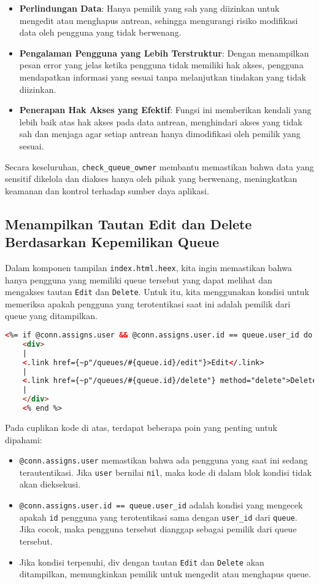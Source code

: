 \begin{itemize}
	\item \textbf{Perlindungan Data}: Hanya pemilik yang sah yang diizinkan untuk mengedit atau menghapus antrean, sehingga mengurangi risiko modifikasi data oleh pengguna yang tidak berwenang.
	\item \textbf{Pengalaman Pengguna yang Lebih Terstruktur}: Dengan menampilkan pesan error yang jelas ketika pengguna tidak memiliki hak akses, pengguna mendapatkan informasi yang sesuai tanpa melanjutkan tindakan yang tidak diizinkan.
	\item \textbf{Penerapan Hak Akses yang Efektif}: Fungsi ini memberikan kendali yang lebih baik atas hak akses pada data antrean, menghindari akses yang tidak sah dan menjaga agar setiap antrean hanya dimodifikasi oleh pemilik yang sesuai.
\end{itemize}

Secara keseluruhan, \texttt{check\_queue\_owner} membantu memastikan bahwa data yang sensitif dikelola dan diakses hanya oleh pihak yang berwenang, meningkatkan keamanan dan kontrol terhadap sumber daya aplikasi.


\subsection{Menampilkan Tautan Edit dan Delete Berdasarkan Kepemilikan Queue}
Dalam komponen tampilan \texttt{index.html.heex}, kita ingin memastikan bahwa hanya pengguna yang memiliki queue tersebut yang dapat melihat dan mengakses tautan \texttt{Edit} dan \texttt{Delete}. Untuk itu, kita menggunakan kondisi untuk memeriksa apakah pengguna yang terotentikasi saat ini adalah pemilik dari queue yang ditampilkan.

\begin{lstlisting}[language=HTML, caption={\texttt{lib/hello\_web/controllers/queue\_html/index.html.heex}}]
	<%= if @conn.assigns.user && @conn.assigns.user.id == queue.user_id do %>
	<div>
	|
	<.link href={~p"/queues/#{queue.id}/edit"}>Edit</.link>
	|
	<.link href={~p"/queues/#{queue.id}/delete"} method="delete">Delete</.link>
	|
	</div>
	<% end %>
\end{lstlisting}

Pada cuplikan kode di atas, terdapat beberapa poin yang penting untuk dipahami:

\begin{itemize}
	\item \texttt{@conn.assigns.user} memastikan bahwa ada pengguna yang saat ini sedang terautentikasi. Jika \texttt{user} bernilai \texttt{nil}, maka kode di dalam blok kondisi tidak akan dieksekusi.
	\item \texttt{@conn.assigns.user.id == queue.user\_id} adalah kondisi yang mengecek apakah \texttt{id} pengguna yang terotentikasi sama dengan \texttt{user\_id} dari \texttt{queue}. Jika cocok, maka pengguna tersebut dianggap sebagai pemilik dari queue tersebut.
	\item Jika kondisi terpenuhi, div dengan tautan \texttt{Edit} dan \texttt{Delete} akan ditampilkan, memungkinkan pemilik untuk mengedit atau menghapus queue.
\end{itemize}

